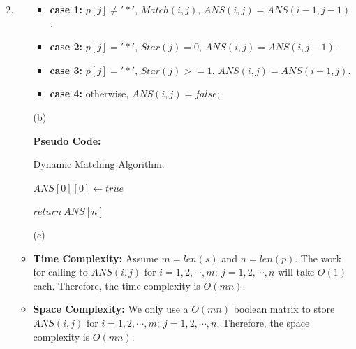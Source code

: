 \documentclass[12pt,a4paper]{article}
\makeatletter
\newtheorem*{solution}{Solution}
\theoremstyle{definition}
\renewenvironment{solution}[1][Solution] {\par\pushQED{\qed}\normalfont\topsep6\p@\@plus6\p@\relax\trivlist\item[\hskip\labelsep\bfseries#1\@addpunct{.}]\ignorespaces}{\popQED\endtrivlist\@endpefalse} \makeatother
\makeatother
\begin{document}
\begin{enumerate}
\begin{solution}
\begin{itemize}
        \begin{itemize}
        \item \textbf{case 1:}
        $p[j] \ne '*'$, $Match(i,j)$,
        $ANS(i,j)=ANS(i-1,j-1)$.
        \item \textbf{case 2:}
        $p[j] = '*'$, $Star(j)=0$,
        $ANS(i,j)=ANS(i,j-1)$.
        \item \textbf{case 3:}
        $p[j] = '*'$, $Star(j)>=1$,
        $ANS(i,j)=ANS(i-1,j)$.
        \item \textbf{case 4:}
        otherwise, $ANS(i,j)=false$;
        \end{itemize}

    \item [(b)]

        \textbf{Pseudo Code:}
    
        \begin{minipage}[t]{0.8\textwidth}
        \begin{algorithm}[H]
        \BlankLine
        \caption{Dynamic Matching Algorithm:}
        \label{ALG3}
        \BlankLine

        $ANS[0][0]\leftarrow true$\;
        
        $return\ ANS[n] $\;

        \end{algorithm}
        \end{minipage}
    \item [(c)]\item []
    \item \textbf{Time Complexity:} Assume $m=len(s)$ and $n=len(p)$. The work for calling to $ANS(i,j)$ for $i=1,2,\cdots ,m;\ j=1,2,\cdots ,n$ will take $O(1)$ each. Therefore, the time complexity is $O(mn)$.
    \item \textbf{Space Complexity:}
    We only use a $O(mn)$ boolean matrix to store $ANS(i,j)$ for $i=1,2,\cdots ,m;\ j=1,2,\cdots ,n$. Therefore, the space complexity is $O(mn)$.
    \end{itemize}
    \end{solution}


\end{enumerate}
\end{document}
